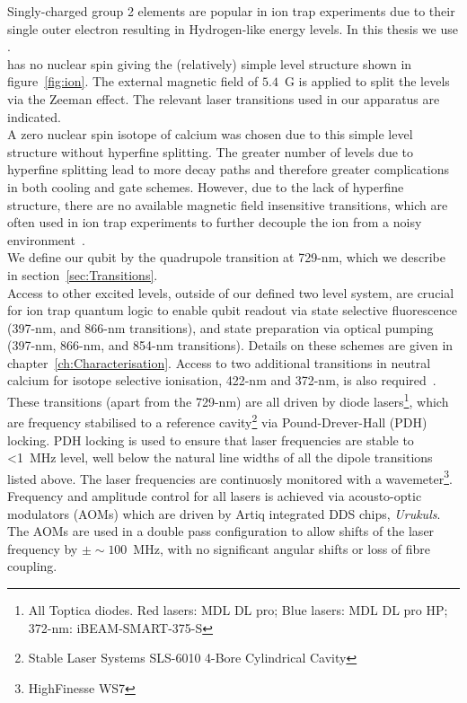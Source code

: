     Singly-charged group 2 elements are popular in ion trap
    experiments due to their single outer electron resulting in Hydrogen-like
    energy levels. In this thesis we use \ca.\\
    \ca has
    no nuclear spin giving the
    (relatively) simple level structure shown in figure~\ref{fig:ion}. The external
    magnetic field of $5.4$~G is applied to split the levels via the Zeeman
    effect. The relevant laser transitions used in our apparatus are indicated.\\
    A zero nuclear spin isotope of calcium was chosen due to this simple level
    structure without hyperfine splitting. The greater number of levels due to
    hyperfine splitting lead to more decay paths and therefore greater
    complications in both cooling and gate schemes. However, due to the lack of hyperfine structure, there are no available magnetic field insensitive transitions, which are
    often used in ion trap experiments to further decouple the ion from a noisy
    environment~\cite{brewer201927al}. \\
    We define our qubit by the quadrupole transition at 729-nm, which we describe in section~\ref{sec:Transitions}.\\
    Access to other excited levels, outside of our defined two level system, are crucial for ion trap quantum logic to enable qubit readout via state selective fluorescence (397-nm, and 866-nm transitions), and state preparation via optical pumping (397-nm, 866-nm, and 854-nm transitions). Details on these schemes are given in chapter~\ref{ch:Characterisation}. Access to two additional transitions in neutral calcium for isotope selective ionisation, 422-nm and 372-nm, is also required~\cite{lucas2004isotope-selective}.\\
    These transitions (apart from the 729-nm) are all driven by diode lasers\footnote{All Toptica diodes. Red lasers: MDL DL pro; Blue lasers: MDL DL pro HP; 372-nm: iBEAM-SMART-375-S}, which are frequency stabilised to a reference cavity\footnote{Stable Laser Systems SLS-6010 4-Bore Cylindrical Cavity} via Pound-Drever-Hall (PDH) locking. 
    PDH locking is used to ensure that laser frequencies are stable to <1~MHz level, well below the natural line widths of all the dipole transitions listed above. The laser frequencies are continuosly monitored with a wavemeter\footnote{HighFinesse WS7}.\\
    Frequency and amplitude control for all lasers is achieved via acousto-optic modulators (AOMs) which are driven by Artiq integrated DDS chips, \emph{Urukuls}. The AOMs are used in a double pass configuration to allow shifts of the laser frequency by $\pm \sim 100$~MHz, with no significant angular shifts or loss of fibre coupling. 
    
